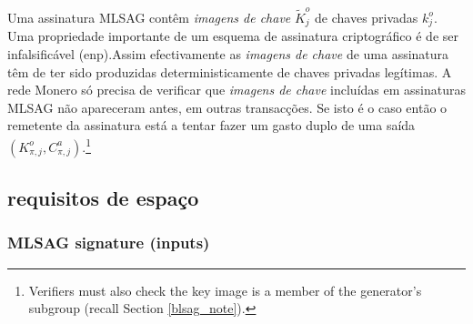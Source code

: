 Uma assinatura MLSAG contêm {\em imagens de chave} \(\tilde{K}^o_j\) de chaves privadas \(k^o_j\). Uma propriedade importante de um esquema de assinatura criptográfico é de ser infalsificável (enp).\newline Assim efectivamente as {\em imagens de chave} de uma assinatura têm de ter sido produzidas deterministicamente de chaves privadas legítimas.
A rede Monero só precisa de verificar que {\em imagens de chave} incluídas em assinaturas MLSAG não apareceram antes, em outras transacções. Se isto é o caso então o remetente da assinatura está a tentar fazer um gasto duplo de uma saída $(K^o_{\pi, j}, C^a_{\pi,j})$.\footnote{Verifiers must also check the key image is a member of the generator's subgroup (recall Section \ref{blsag_note}).} 


\subsection{requisitos de espaço}
\label{subsec:space-and-ver-rcttypefull}

\subsubsection*{MLSAG signature (inputs)}

